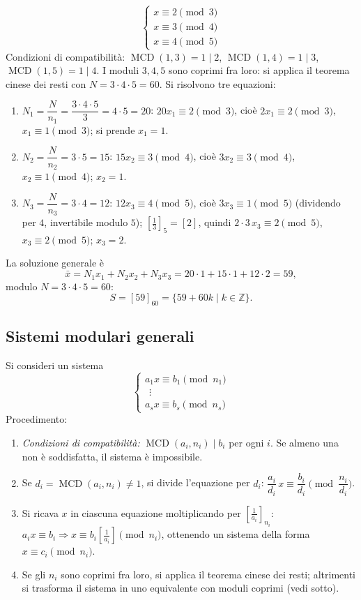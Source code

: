 \documentclass[11pt,a4paper]{article}
\begin{document}
\begin{esempio}
\[
  \begin{cases} x \equiv 2 \pmod 3 \\ x \equiv 3 \pmod 4 \\ x \equiv 4 \pmod 5 \end{cases}
\]
Condizioni di compatibilità: $\operatorname{MCD}(1, 3) = 1 \mid 2$, $\operatorname{MCD}(1, 4) = 1 \mid 3$, $\operatorname{MCD}(1, 5) = 1 \mid 4$. I moduli $3, 4, 5$ sono coprimi fra loro: si applica il teorema cinese dei resti con $N = 3\cdot 4\cdot 5 = 60$. Si risolvono tre equazioni:
\begin{enumerate}
  \item $N_1 = \dfrac{N}{n_1} = \dfrac{3\cdot 4\cdot 5}{3} = 4\cdot 5 = 20$: $20x_1 \equiv 2 \pmod 3$, cioè $2x_1 \equiv 2 \pmod 3$, $x_1 \equiv 1 \pmod 3$; si prende $x_1 = 1$.
  \item $N_2 = \dfrac{N}{n_2} = 3\cdot 5 = 15$: $15x_2 \equiv 3 \pmod 4$, cioè $3x_2 \equiv 3 \pmod 4$, $x_2 \equiv 1 \pmod 4$; $x_2 = 1$.
  \item $N_3 = \dfrac{N}{n_3} = 3\cdot 4 = 12$: $12x_3 \equiv 4 \pmod 5$, cioè $3x_3 \equiv 1 \pmod 5$ (dividendo per $4$, invertibile modulo $5$); $\left[\tfrac{1}{3}\right]_5 = [2]$, quindi $2\cdot 3\,x_3 \equiv 2 \pmod 5$, $x_3 \equiv 2 \pmod 5$; $x_3 = 2$.
\end{enumerate}
La soluzione generale è
\[
  \bar{x} = N_1x_1 + N_2x_2 + N_3x_3 = 20\cdot 1 + 15\cdot 1 + 12\cdot 2 = 59,
\]
modulo $N = 3\cdot 4\cdot 5 = 60$:
\[
  S = [59]_{60} = \{59 + 60k \mid k \in \mathbb{Z}\}.
\]
\end{esempio}

\subsection{Sistemi modulari generali}

Si consideri un sistema
\[
  \begin{cases} a_1x \equiv b_1 \pmod{n_1} \\ \ \ \vdots \\ a_sx \equiv b_s \pmod{n_s} \end{cases}
\]
Procedimento:
\begin{enumerate}
  \item \emph{Condizioni di compatibilità:} $\operatorname{MCD}(a_i, n_i) \mid b_i$ per ogni $i$. Se almeno una non è soddisfatta, il sistema è impossibile.
  \item Se $d_i = \operatorname{MCD}(a_i, n_i) \neq 1$, si divide l'equazione per $d_i$: $\dfrac{a_i}{d_i}\,x \equiv \dfrac{b_i}{d_i} \pmod{\dfrac{n_i}{d_i}}$.
  \item Si ricava $x$ in ciascuna equazione moltiplicando per $\left[\tfrac{1}{a_i}\right]_{n_i}$: $a_ix \equiv b_i \Rightarrow x \equiv b_i\left[\tfrac{1}{a_i}\right] \pmod{n_i}$, ottenendo un sistema della forma $x \equiv c_i \pmod{n_i}$.
  \item Se gli $n_i$ sono coprimi fra loro, si applica il teorema cinese dei resti; altrimenti si trasforma il sistema in uno equivalente con moduli coprimi (vedi sotto).
\end{enumerate}
\end{document}
